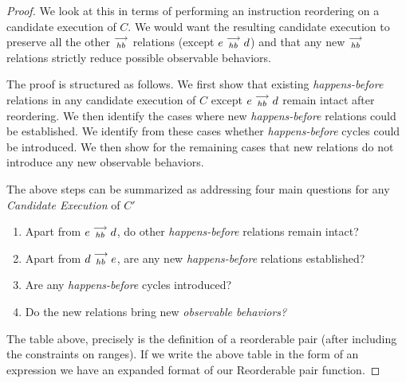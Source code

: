 \begin{proof}

    We look at this in terms of performing an instruction reordering on a candidate execution of $C$. We would want the resulting candidate execution to preserve all the other $\stackrel{\longrightarrow}{_{hb}}$ relations (except $e\stackrel{\longrightarrow}{_{hb}}d$) and that any new $\stackrel{\longrightarrow}{_{hb}}$ relations strictly reduce possible observable behaviors.
    
    The proof is structured as follows. We first show that existing \textit{happens-before} relations in any candidate execution of $C$ except $e\stackrel{\longrightarrow}{_{hb}}d$ remain intact after reordering. We then identify the cases where new \textit{happens-before} relations could be established. We identify from these cases whether \textit{happens-before} cycles could be introduced.
    We then show for the remaining cases that new relations do not introduce any new observable behaviors.

    The above steps can be summarized as addressing four main questions for any \textit{Candidate Execution} of $C'$
    \begin{enumerate}
        \item Apart from $e\stackrel{\longrightarrow}{_{hb}}d$, do other \emph{happens-before} relations remain intact?
        \item Apart from $d\stackrel{\longrightarrow}{_{hb}}e$, are any new \emph{happens-before} relations established? 
        \item Are any \emph{happens-before} cycles introduced? 
        \item Do the new relations bring new \emph{observable behaviors?}
    \end{enumerate}
    
    
    
    
    

    The table above, precisely is the definition of a reorderable pair (after including the constraints on ranges). If we write the above table in the form of an expression we have an expanded format of our Reorderable pair function. 


\end{proof}
